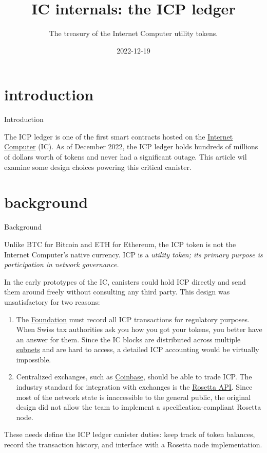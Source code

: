 \documentclass{article}
\title{IC internals: the ICP ledger}
\subtitle{The treasury of the Internet Computer utility tokens.}
\date{2022-12-19}
\begin{document}
\section{introduction}{Introduction}

The ICP ledger is one of the first smart contracts hosted on the \href{https://internetcomputer.org}{Internet Computer} (IC).
As of December 2022, the ICP ledger holds hundreds of millions of dollars worth of tokens and never had a significant outage.
This article wil examine some design choices powering this critical canister.

\section{background}{Background}

Unlike BTC for Bitcoin and ETH for Ethereum, the ICP token is not the Internet Computer's native currency.
ICP is a \em{utility token}; its primary purpose is participation in network governance.

In the early prototypes of the IC, canisters could hold ICP directly and send them around freely without consulting any third party.
This design was unsatisfactory for two reasons:
\begin{enumerate}
  \item
    The \href{https://dfinity.org/}{Foundation} must record all ICP transactions for regulatory purposes.
    When Swiss tax authorities ask you how you got your tokens, you better have an answer for them.
    Since the IC blocks are distributed across multiple \href{/posts/08-ic-xnet.html#subnets}{subnets} and are hard to access, a detailed ICP accounting would be virtually impossible.
  \item
    Centralized exchanges, such as \href{https://www.coinbase.com/}{Coinbase}, should be able to trade ICP.
    The industry standard for integration with exchanges is the \href{https://rosetta-api.org/}{Rosetta API}.
    Since most of the network state is inaccessible to the general public, the original design did not allow the team to implement a specification-compliant Rosetta node.
\end{enumerate}

These needs define the ICP ledger canister duties: keep track of token balances, record the transaction history, and interface with a Rosetta node implementation.
\end{document}
